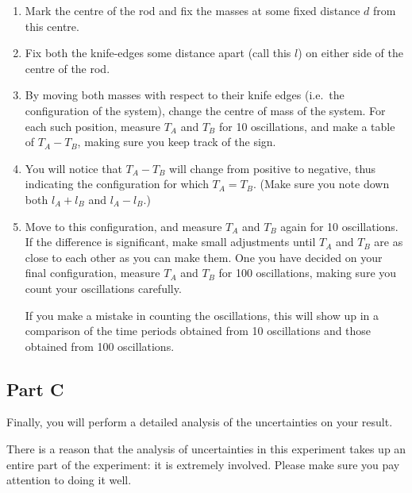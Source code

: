 \begin{enumerate}
\itemsep0em
    \item Mark the centre of the rod and fix the masses at some fixed distance $d$ from this centre.
    
    \item Fix both the knife-edges some distance apart (call this $l$) on either side of the centre of the rod.
    
    \item By moving both masses with respect to their knife edges (i.e.\ the configuration of the system), change the centre of mass of the system. For each such position, measure $T_A$ and $T_B$ for 10 oscillations, and make a table of $T_A - T_B$, making sure you keep track of the sign. 
    
    \item You will notice that $T_A - T_B$ will change from positive to negative, thus indicating the configuration for which $T_A = T_B$. (Make sure you note down both $l_A + l_B$ and $l_A - l_B$.)

    \item Move to this configuration, and measure $T_A$ and $T_B$ again for 10 oscillations. If the difference is significant, make small adjustments until $T_A$ and $T_B$ are as close to each other as you can make them. One you have decided on your final configuration, measure $T_A$ and $T_B$ for 100 oscillations, making sure you count your oscillations carefully. 
    
    \begin{tip}
    If you make a mistake in counting the oscillations, this will show up in a comparison of the time periods obtained from 10 oscillations and those obtained from 100 oscillations.
    \end{tip}

\end{enumerate}

\subsection*{Part C}

Finally, you will perform a detailed analysis of the uncertainties on your result. 

\begin{imp}
There is a reason that the analysis of uncertainties in this experiment takes up an entire part of the experiment: it is extremely involved. Please make sure you pay attention to doing it well.
\end{imp}

